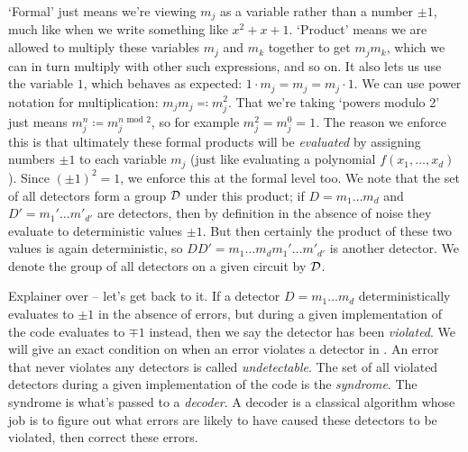 `Formal' just means we're viewing $m_j$ as a variable rather than a number $\pm 1$, much like when we write something like $x^2 + x + 1$.
`Product' means we are allowed to multiply these variables $m_j$ and $m_k$ together to get $m_j m_k$, which we can in turn multiply with other such expressions, and so on.
It also lets us use the variable $1$, which behaves as expected: $1 \cdot m_j = m_j = m_j \cdot 1$.
We can use power notation for multiplication: $m_j m_j \eqqcolon m_j^2$.
That we're taking `powers modulo 2' just means $m_j^n \coloneqq m_j^{n \text{ mod } 2}$, so for example $m_j^2 = m_j^0 = 1$.
The reason we enforce this is that ultimately these formal products will be \textit{evaluated} by assigning numbers $\pm 1$ to each variable $m_j$ (just like evaluating a polynomial $f(x_1, \ldots, x_d)$).
Since $(\pm 1)^2 = 1$, we enforce this at the formal level too.
We note that the set of all detectors form a group $\mathcal{D}$ under this product; if $D = m_1 \ldots m_d$ and $D' = m_1' \ldots m'_{d'}$ are detectors, then by definition in the absence of noise they evaluate to deterministic values $\pm 1$.
But then certainly the product of these two values is again deterministic, so $DD' = m_1 \ldots m_d m_1' \ldots m'_{d'}$ is another detector.
We denote the group of all detectors on a given circuit by $\mathcal{D}$.

Explainer over -- let's get back to it.
If a detector $D = m_1 \ldots m_d$ deterministically evaluates to $\pm 1$ in the absence of errors, but during a given implementation of the code evaluates to $\mp 1$ instead, then we say the detector has been \textit{violated}.
We will give an exact condition on when an error violates a detector in .
An error that never violates any detectors is called \textit{undetectable}.
The set of all violated detectors during a given implementation of the code is the \textit{syndrome}.
The syndrome is what's passed to a \textit{decoder}.
A decoder is a classical algorithm whose job is to figure out what errors are likely to have caused these detectors to be violated, then correct these errors.

